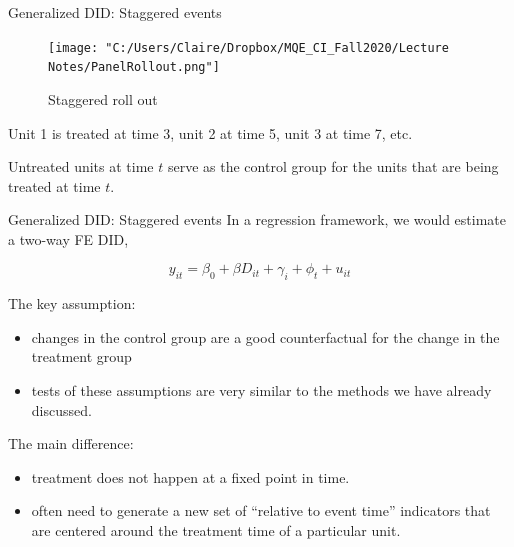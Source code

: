 \documentclass[
  ignorenonframetext,
]{beamer}
\begin{document}
\begin{frame}{Generalized DID: Staggered events}
\protect\hypertarget{generalized-did-staggered-events-1}{}
\begin{figure}
\centering
\texttt{[image: "C:/Users/Claire/Dropbox/MQE\_CI\_Fall2020/Lecture Notes/PanelRollout.png"]}
\caption{Staggered roll out}
\end{figure}

Unit 1 is treated at time 3, unit 2 at time 5, unit 3 at time 7, etc.

Untreated units at time \(t\) serve as the control group for the units
that are being treated at time \(t\).
\end{frame}

\begin{frame}{Generalized DID: Staggered events}
\protect\hypertarget{generalized-did-staggered-events-2}{}
In a regression framework, we would estimate a two-way FE DID,

\[
y_{it}=\beta_0+\beta D_{it}+\gamma_i+\phi_t+u_{it}
\]

The key assumption:

\begin{itemize}
\item
  changes in the control group are a good counterfactual for the change
  in the treatment group
\item
  tests of these assumptions are very similar to the methods we have
  already discussed.
\end{itemize}

The main difference:

\begin{itemize}
\item
  treatment does not happen at a fixed point in time.
\item
  often need to generate a new set of ``relative to event time''
  indicators that are centered around the treatment time of a particular
  unit.
\end{itemize}
\end{frame}
\end{document}
